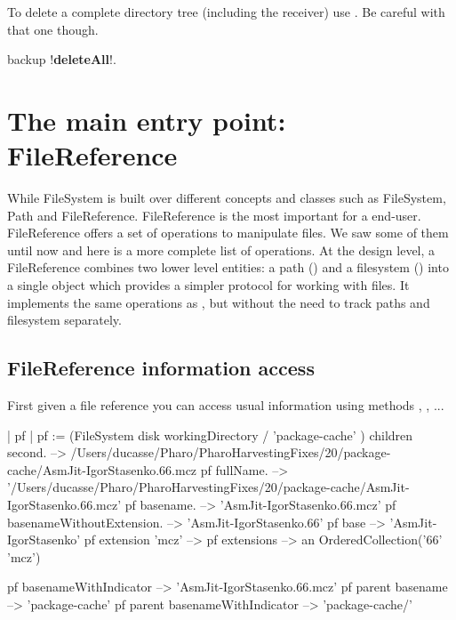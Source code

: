 \documentclass[a4paper,10pt,twoside]{book}
\begin{document}
To delete a complete directory tree (including the receiver) use . Be careful with that one though.

\begin{code}{}
backup !\textbf{deleteAll}!.
\end{code}




\section{The main entry point: FileReference}
While FileSystem is built over different concepts and classes such as FileSystem, Path and FileReference. FileReference is the most important for
a end-user. FileReference offers a set of operations to manipulate files. We saw some of them until now and here is a more complete list of operations.
At the design level, a FileReference combines two lower level entities: a path () and a filesystem () into a single object which provides a simpler protocol for working with files. It implements the same operations as , but without the need to track paths and filesystem separately.

\subsection{FileReference information access}
First given a file reference you can access usual information using methods , , ...

\begin{code}{}
| pf |
pf := (FileSystem disk workingDirectory / 'package-cache' ) children second.
  -->  /Users/ducasse/Pharo/PharoHarvestingFixes/20/package-cache/AsmJit-IgorStasenko.66.mcz
pf fullName.
  --> '/Users/ducasse/Pharo/PharoHarvestingFixes/20/package-cache/AsmJit-IgorStasenko.66.mcz'
pf basename.
  --> 'AsmJit-IgorStasenko.66.mcz'  
pf basenameWithoutExtension. 
  -->	'AsmJit-IgorStasenko.66'
pf base 
	--> 'AsmJit-IgorStasenko'
pf extension 'mcz'
    -->
pf extensions
	--> an OrderedCollection('66' 'mcz')
\end{code}

\begin{code}{}
pf  basenameWithIndicator  
	--> 'AsmJit-IgorStasenko.66.mcz'
pf parent  basename 
	--> 'package-cache'
pf parent basenameWithIndicator  
	--> 'package-cache/'
\end{code}
\end{document}
